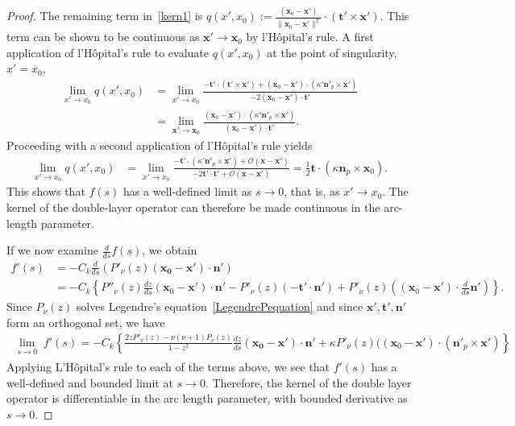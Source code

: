 \documentclass[final]{siamltex}
\newcommand{\C}{C_k}
\begin{document}
\begin{proof}
The remaining term in~\eqref{kern1} is $q(x',x_0) :=
\frac{(\mathbf{x}_{0}-\mathbf{x'})}{\|\mathbf{x}_{0}-\mathbf{x'}\|^2}
\cdot \left( \mathbf{t'} \times \mathbf{x'} \right).$  This term can be
shown to be continuous as $\mathbf{x'} \rightarrow \mathbf{x}_{0}$ by
l'H\^{o}pital's rule.  A first application of l'H\^{o}pital's rule to
evaluate $q(x',x_0)$ at the point of singularity, $x' = x_{0}$, 
\begin{align*}
  \lim_{x' \rightarrow x_{0}}q(x',x_{0}) & = 
  \lim_{x' \rightarrow x_{0}} 
  \frac{ -\mathbf{t'} \cdot \left(\mathbf{t'} \times \mathbf{x'} \right)
  + (\mathbf{x}_{0}-\mathbf{x'}) \cdot \left( \kappa' \mathbf{n'}_{p}
  \times \mathbf{x'} \right)}
  {-2(\mathbf{x}_{0} - \mathbf{x'}) \cdot \mathbf{t'}} \\
  & = \lim_{\mathbf{x'} \rightarrow \mathbf{x}_{0}} 
  \frac{(\mathbf{x}_{0}-\mathbf{x'}) \cdot \left(
  \kappa'\mathbf{n'}_{p} \times \mathbf{x'}\right)}
  {(\mathbf{x}_{0} - \mathbf{x'}) \cdot \mathbf{t'}}. 
\end{align*}
Proceeding with a second application of l'H\^{o}pital's rule yields
\begin{align*}
  \lim_{x' \rightarrow x_{0}} q(x',x_0)  
  & = \lim_{x' \rightarrow x_{0}} \frac{-\mathbf{t'} \cdot 
  \left( \kappa' \mathbf{n'}_{p} \times \mathbf{x'} \right) +
  \mathcal{O}(\mathbf{x}-\mathbf{x'})}
  {-2\mathbf{t'} \cdot \mathbf{t'} + \mathcal{O}(\mathbf{x}-\mathbf{x'})}
  = \frac{1}{2} \mathbf{t} \cdot \left( \kappa \mathbf{n}_{p} \times 
  \mathbf{x}_{0} \right).
\end{align*}
This shows that $f(s)$ has a well-defined limit as $s\rightarrow 0$,
that is, as $x'\rightarrow x_0$. The kernel of the double-layer
operator can therefore be made continuous in the arc-length parameter.

If we now examine $\frac{d}{ds}f(s)$, we obtain
\begin{align*} 
  f'(s)&= -\C \frac{d}{ds}\left( P'_\nu(z)(\mathbf{x_0}-\mathbf{x'}) \cdot 
    \mathbf{n'} \right) \\
  &=-C_{k} \left\{P''_{\nu}(z) \frac{dz}{ds}
    (\mathbf{x}_{0}-\mathbf{x'})  \cdot \mathbf{n'} - P'_{\nu}(z)
    (-\mathbf{t'} \cdot \mathbf{n'}) + P'_\nu(z)((\mathbf{x}_{0} -
    \mathbf{x'}) \cdot \frac{d}{ds}\mathbf{n'})\right\}.
 \end{align*}
Since $P_\nu(z)$ solves Legendre's equation~\eqref{LegendrePequation}
and since $\mathbf{x'},\mathbf{t'}, \mathbf{n'}$ form an orthogonal set,
we have
\begin{align*}
  \lim_{\substack {s \rightarrow 0}} f'(s) =-C_k
  \left\{\frac{2zP'_{\nu}(z)-\nu(\nu+1)P_{\nu}(z)}{1-z^2}
  \frac{dz}{ds}(\mathbf{x_0}-\mathbf{x'})\cdot \mathbf{n'} + \kappa
  P'_\nu(z)((\mathbf{x}_{0}-\mathbf{x'})\cdot (\mathbf{n}'_{p} \times 
  \mathbf{x'})\right\}
\end{align*}
Applying L'H\^{o}pital's rule to each of the terms above, we see that
$f'(s)$ has a well-defined and bounded limit at $s \rightarrow 0$.
Therefore, the kernel of the double layer operator is differentiable in
the arc length parameter, with bounded derivative as $s \rightarrow 0$. 


\end{proof}
\end{document}
